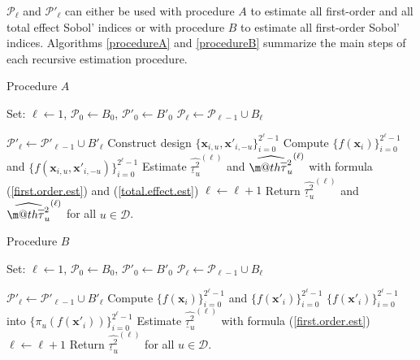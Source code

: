 \documentclass[]{elsarticle}
\makeatletter
\theoremstyle{definition}
\newcommand{\bvec}[1]{\boldsymbol{#1}}
\newcommand{\vx}{\bvec{x}}
\newcommand*{\ov}[1]{
  \m@th\overline{\mbox{#1}\raisebox{2mm}{}}
}
\makeatother
\begin{document}
$\mathcal{P}_{\ell}$ and $\mathcal{P}'_{\ell}$ can either be used with procedure $A$ to estimate all first-order and all total effect Sobol' indices or with procedure $B$ to estimate all first-order Sobol' indices. Algorithms \ref{procedureA} and \ref{procedureB} summarize the main steps of each recursive estimation procedure.
\begin{algorithm}[!ht]
\caption{Procedure $A$}
\begin{algorithmic}[1]
\vspace*{0.2cm}
\State Set: $\ell \leftarrow 1$, $\mathcal{P}_{0} \leftarrow B_0$, ${\mathcal{P}'}_{0} \leftarrow {B'}_0$
\State $\mathcal{P}_\ell \leftarrow \mathcal{P}_{\ell-1} \cup B_\ell$

\hspace*{-0.3cm} $\mathcal{P}'_\ell \leftarrow \mathcal{P}'_{\ell-1} \cup {B'}_\ell$
\State Construct design $\{\vx_{i,u},{\vx'}_{i,-u}\}_{i=0}^{2^{\ell}-1}$
\State Compute $\{f(\vx_i)\}_{i=0}^{2^\ell-1}$ and $\{f(\vx_{i,u},{\vx'}_{i,-u})\}_{i=0}^{2^\ell-1}$
\State Estimate $\widehat{\underline{\tau}_u^2}^{(\ell)}$ and $\widehat{\ov{$\tau$}_u^2}^{(\ell)}$ with formula (\ref{first.order.est}) and (\ref{total.effect.est})
\EndFor
\State $\ell \leftarrow \ell + 1$
\EndWhile
\State Return $\widehat{\underline{\tau}_u^2}^{(\ell)}$ and $\widehat{\ov{$\tau$}_u^2}^{(\ell)}$ for all $u \in \mathcal{D}$.
\end{algorithmic}
\label{procedureA}
\end{algorithm}
\begin{algorithm}[!ht]
\caption{Procedure $B$}
\begin{algorithmic}[1]
\vspace*{0.2cm}
\State Set: $\ell \leftarrow 1$, $\mathcal{P}_{0} \leftarrow B_0$, ${\mathcal{P}'}_{0} \leftarrow {B'}_0$
\State $\mathcal{P}_\ell \leftarrow \mathcal{P}_{\ell-1} \cup B_\ell$

\hspace*{-0.3cm} $\mathcal{P}'_\ell \leftarrow \mathcal{P}'_{\ell-1} \cup {B'}_\ell$
\State Compute $\{f(\vx_i)\}_{i=0}^{2^\ell-1}$ and $\{f({\vx'}_i)\}_{i=0}^{2^\ell-1}$
\State  $\{f({\vx'}_i)\}_{i=0}^{2^\ell-1}$ into $\{\pi_u(f({\vx'}_i))\}_{i=0}^{2^\ell-1}$
\State Estimate $\widehat{\underline{\tau}_u^2}^{(\ell)}$ with formula (\ref{first.order.est})
\EndFor
\State $\ell \leftarrow \ell + 1$
\EndWhile
\State Return $\widehat{\underline{\tau}_u^2}^{(\ell)}$ for all $u \in \mathcal{D}$.
\end{algorithmic}
\label{procedureB}
\end{algorithm}
\end{document}
